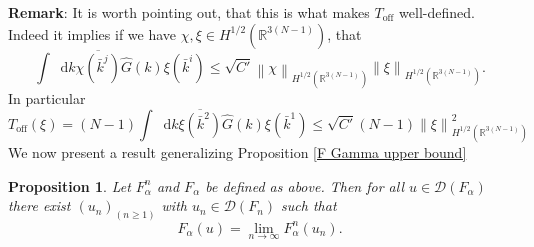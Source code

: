 \documentclass[a4paper,11pt]{article}
\newcommand{\norm}[1]{\left\lVert #1 \right\rVert}
\newcommand{\dom}[1]{\mathscr D\left(#1\right)}
\newcommand*\diff{\mathop{}\!\mathrm{d}}
\newcommand{\R}{\mathbb{R}}
\newtheorem{proposition}{Proposition}
\numberwithin{equation}{section}
\begin{document}
\textbf{Remark}: It is worth pointing out, that this is what makes $ T_{\text{off}} $ well-defined. Indeed it implies if we have $ \chi,\xi\in H^{1/2}(\R^{3(N-1)}) $, that \begin{equation}
\int\diff k\overline{\chi(\bar{k}^j)}\hat{G}(k)\xi(\bar{k}^i)\leq \sqrt{C'}\norm{\chi}_{H^{1/2}(\R^{3(N-1)})}\norm{\xi}_{H^{1/2}(\R^{3(N-1)})}.
\end{equation}
In particular \begin{equation}
T_{\text{off}}(\xi)=(N-1)\int\diff k\overline{\xi(\bar{k}^2)}\hat{G}(k)\xi(\bar{k}^1)\leq\sqrt{C'}(N-1)\norm{\xi}_{H^{1/2}(\R^{3(N-1)})}^2
\end{equation}
We now present a result generalizing Proposition \ref{F Gamma upper bound}
\begin{proposition}\label{F Gamma upper bound(N+1)}
	Let $ F_\alpha^n $ and $ F_\alpha $ be defined as above. Then for all $ u\in\dom{F_\alpha} $ there exist $ (u_n)_{(n\geq1)} $ with $ u_n\in\dom{F_n} $ such that \begin{equation}
	F_\alpha(u)=\lim\limits_{n\to\infty}F^n_\alpha(u_n).
	\end{equation}
\end{proposition}
\end{document}
